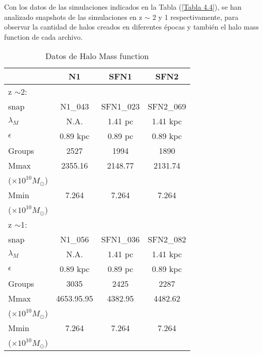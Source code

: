 \documentclass[a4paper,openright,12pt]{book}
\begin{document}
\begin{table}[]
\begin{tabular}{llccccccl}
\end{tabular}
\end{table}

Con los datos de las simulaciones indicados en la Tabla (\ref{Tabla 4.4}), se han analizado \textsf{snapshots} de las simulaciones en z $\sim$ 2 y 1 respectivamente, para observar la cantidad de halos creados en diferentes épocas y también el halo mass function de cada archivo.


\begin{table}\footnotesize
\caption{Datos de Halo Mass function}
\label{Tabla 4.5}\centering%
\begin{tabular}{lccc}
\toprule%
&N1&SFN1&SFN2 \\\toprule%
z $\sim $2:\\
\textsf{snap}&N1\_{043}&SFN1\_{023}&SFN2\_{069}\\
$\lambda_{M}$&N.A.&1.41 pc&1.41 kpc\\
$\epsilon$&0.89 kpc&0.89 pc& 0.89 kpc\\
\textsf{Groups}&2527&1994&1890\\
\textsf{Mmax}&2355.16&2148.77&2131.74\\
($\times10^{10}M_\odot$)\\
\textsf{Mmin}&7.264&7.264&7.264\\
($\times10^{10}M_\odot$)\\\midrule
z $\sim $1:\\
\textsf{snap}&N1\_{056}&SFN1\_{036}&SFN2\_{082}\\
$\lambda_{M}$&N.A.&1.41 pc&1.41 kpc\\
$\epsilon$&0.89 kpc&0.89 pc& 0.89 kpc\\
\textsf{Groups}&3035&2425&2287\\
\textsf{Mmax}&4653.95.95&4382.95&4482.62\\
($\times10^{10}M_\odot$)\\
\textsf{Mmin}&7.264&7.264&7.264\\
($\times10^{10}M_\odot$)\\\bottomrule

\end{tabular}
\end{table} 
\end{document}
